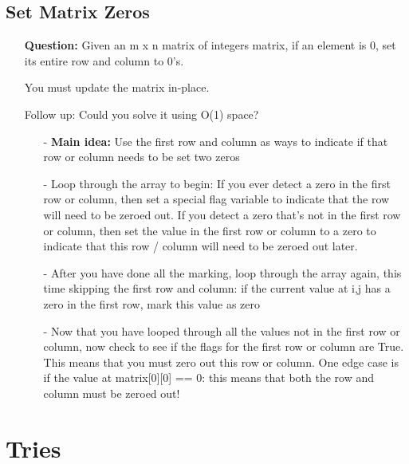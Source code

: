 \documentclass[12pt]{article}
\begin{document}
\subsection{Set Matrix Zeros}
\begin{enumerate}
  \item[] \textbf{Question:} Given an m x n matrix of integers matrix, if an element is 0, set its entire row and column to 0's.

You must update the matrix in-place.

Follow up: Could you solve it using O(1) space?

    \begin{enumerate}
      \item[-] \textbf{Main idea:} Use the first row and column as ways to indicate if that row or column needs to be set two zeros
      \item[-] Loop through the array to begin: If you ever detect a zero in the first row or column, then set a special flag variable to indicate that the row will need to be zeroed out. If you detect a zero that's not in the first row or column, then set the value in the first row or column to a zero to indicate that this row / column will need to be zeroed out later.
      \item[-] After you have done all the marking, loop through the array again, this time skipping the first row and column: if the current value at i,j has a zero in the first row, mark this value as zero
      \item[-] Now that you have looped through all the values not in the first row or column, now check to see if the flags for the first row or column are True. This means that you must zero out this row or column. One edge case is if the value at matrix[0][0] == 0: this means that both the row and column must be zeroed out!

    \end{enumerate}
\end{enumerate}



\section{Tries}
\end{document}
